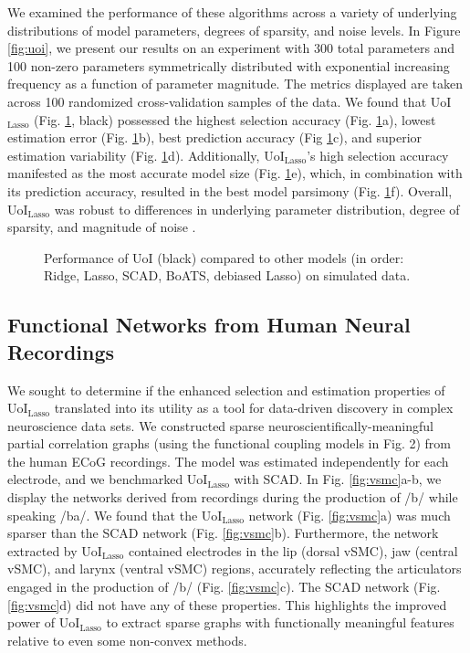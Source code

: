 \documentclass[letterpaper, 10 pt, conference]{ieeeconf}  %
\begin{document}
We examined the performance of these algorithms across a variety of underlying distributions of model parameters, degrees of sparsity, and noise levels. In Figure \ref{fig:uoi}, we present our results on an experiment with 300 total parameters and 100 non-zero parameters symmetrically distributed with exponential increasing frequency as a function of parameter magnitude. The metrics displayed are taken across 100 randomized cross-validation samples of the data. We found that UoI$_{\text{Lasso}}$ (Fig. \ref{fig:simulated}, black) possessed the highest selection accuracy (Fig. \ref{fig:simulated}a), lowest estimation error (Fig. \ref{fig:simulated}b), best prediction accuracy (Fig \ref{fig:simulated}c), and superior estimation variability (Fig. \ref{fig:simulated}d). Additionally, UoI$_{\text{Lasso}}$'s high selection accuracy manifested as the most accurate model size (Fig. \ref{fig:simulated}e), which, in combination with its prediction accuracy, resulted in the best model parsimony (Fig. \ref{fig:simulated}f). Overall, UoI$_{\text{Lasso}}$ was robust to differences in underlying parameter distribution, degree of sparsity, and magnitude of noise \cite{uoi}.
\begin{figure}[t]
    \centering
    \vspace{-20pt}
    \caption{Performance of UoI (black) compared to other models (in order: Ridge, Lasso, SCAD, BoATS, debiased Lasso) on simulated data.}
    \label{fig:simulated}
    \vspace{-15pt}
\end{figure}

\subsection{Functional Networks from Human Neural Recordings}

We sought to determine if the enhanced selection and estimation properties of UoI$_{\text{Lasso}}$ translated into its utility as a tool for data-driven discovery in complex neuroscience data sets. We constructed sparse neuroscientifically-meaningful partial correlation graphs (using the functional coupling models in Fig. 2) from the human ECoG recordings. The model was estimated independently for each electrode, and we benchmarked UoI$_{\text{Lasso}}$ with SCAD. In Fig. \ref{fig:vsmc}a-b, we display the networks derived from recordings during the production of /b/ while speaking /ba/. We found that the UoI$_{\text{Lasso}}$ network (Fig. \ref{fig:vsmc}a) was much sparser than the SCAD network (Fig. \ref{fig:vsmc}b). Furthermore, the network extracted by UoI$_{\text{Lasso}}$ contained electrodes in the lip (dorsal vSMC), jaw (central vSMC), and larynx (ventral vSMC) regions, accurately reflecting the articulators engaged in the production of /b/ (Fig. \ref{fig:vsmc}c). The SCAD network (Fig. \ref{fig:vsmc}d) did not have any of these properties. This highlights the improved power of UoI$_{\text{Lasso}}$ to extract sparse graphs with functionally meaningful features relative to even some non-convex methods.
\end{document}
